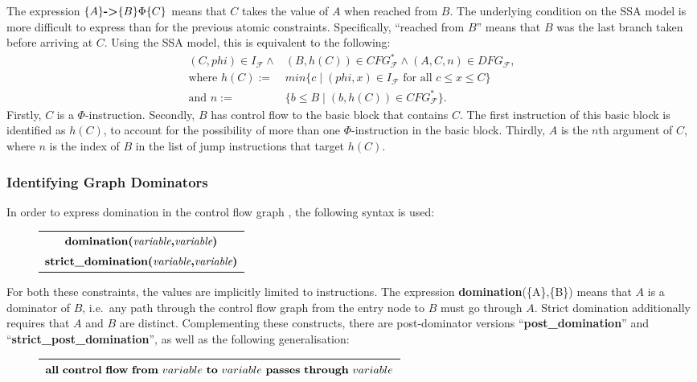     \noindent
    The expression $\{A\}\text{\bf ->}\{B\}\Phi\{C\}$ means that
    $C$ takes the value of $A$ when reached from $B$.
    The underlying condition on the SSA model is more difficult to express than
    for the previous atomic constraints.
    Specifically, ``reached from $B$'' means that $B$ was the last branch
    taken before arriving at $C$.
    Using the SSA model, this is equivalent to the following:
    \begin{align*}
        (C,phi)\in I_\mathcal F\mathrel\land{}&(B,h(C))\in CFG_\mathcal F^*\mathrel\land(A,C,n)\in DFG_\mathcal F,\\
            \text{where }h(C):={}&min\{c\mid (phi,x)\in I_\mathcal F\text{ for all }c\leq x\leq C\}\\
            \text{and }n:={}&\{b\leq B\mid (b,h(C))\in CFG_\mathcal F^*\}.
    \end{align*}
    Firstly, $C$ is a $\Phi$-instruction.
    Secondly, $B$ has control flow to the basic block that contains $C$.
    The first instruction of this basic block is identified as $h(C)$, to
    account for the possibility of more than one $\Phi$-instruction in the
    basic block.
    Thirdly, $A$ is the $n$th argument of $C$, where $n$ is the index of $B$ in
    the list of jump instructions that target $h(C)$.

\subsubsection{Identifying Graph Dominators}

    In order to express domination in the control flow graph
    \citep{Cytron:1989:AGD:73141.74823}, the following syntax is used:
\begin{figure}[h]
    \centering
    \begin{tabular}{|c|}
        \hline
        $\text{\bf domination(}\text{\it variable}\text{\bf,} \text{\it variable}\text{\bf)}$\\
        $\text{\bf strict\_domination(}\text{\it variable}\text{\bf,} \text{\it variable}\text{\bf)}$\\
        \hline
    \end{tabular}
\end{figure}

    \noindent
    For both these constraints, the values are implicitly limited to
    instructions.
    The expression {\bf domination}(\{A\},\{B\}) means that $A$ is a
    dominator of $B$, i.e.\ any path through the control flow graph from the
    entry node to $B$ must go through $A$.
    Strict domination additionally requires that $A$ and $B$ are distinct.
    Complementing these constructs, there are post-dominator versions
    ``{\bf post\_domination}'' and ``{\bf strict\_post\_domination}'', as well
    as the following generalisation:
\begin{figure}[h]
    \centering
    \begin{tabular}{|c|}
        \hline
        ${\bf all}\ {\bf control}\ {\bf flow}\ {\bf from}\ variable\ {\bf to}\ variable\ {\bf passes}\ {\bf through}\ variable$\\
        \hline
    \end{tabular}
\end{figure}

